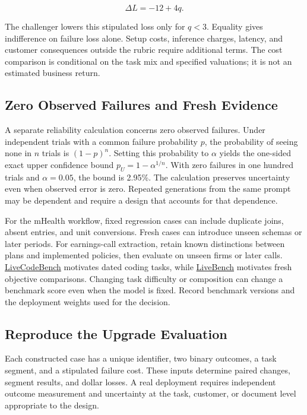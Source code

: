 \[
\Delta L=-12+4q.
\]

The challenger lowers this stipulated loss only for \(q<3\). Equality
gives indifference on failure loss alone. Setup costs, inference
charges, latency, and customer consequences outside the rubric require
additional terms. The cost comparison is conditional on the task mix and
specified valuations; it is not an estimated business return.

\hypertarget{M07-zero-observed-failures-and-fresh-evidence}{%
\subsection{Zero Observed Failures and Fresh
Evidence}\label{M07-zero-observed-failures-and-fresh-evidence}}

\noindent \noindent A separate reliability calculation concerns zero observed
failures. Under independent trials with a common failure probability
\(p\), the probability of seeing none in \(n\) trials is \((1-p)^n\).
Setting this probability to \(\alpha\) yields the one-sided exact upper
confidence bound \(p_U=1-\alpha^{1/n}\). With zero failures in one
hundred trials and \(\alpha=0.05\), the bound is 2.95\%. The calculation
preserves uncertainty even when observed error is zero. Repeated
generations from the same prompt may be dependent and require a design
that accounts for that dependence.

For the mHealth workflow, fixed regression cases can include duplicate
joins, absent entries, and unit conversions. Fresh cases can introduce
unseen schemas or later periods. For earnings-call extraction, retain
known distinctions between plans and implemented policies, then evaluate
on unseen firms or later calls.
\href{https://arxiv.org/abs/2403.07974v2}{LiveCodeBench} motivates dated
coding tasks, while \href{https://arxiv.org/abs/2406.19314v2}{LiveBench}
motivates fresh objective comparisons. Changing task difficulty or
composition can change a benchmark score even when the model is fixed.
Record benchmark versions and the deployment weights used for the
decision.

\hypertarget{M07-reproduce-the-upgrade-evaluation}{%
\subsection{Reproduce the Upgrade
Evaluation}\label{M07-reproduce-the-upgrade-evaluation}}

\noindent \noindent Each constructed case has a unique identifier, two binary
outcomes, a task segment, and a stipulated failure cost. These inputs
determine paired changes, segment results, and dollar losses. A real
deployment requires independent outcome measurement and uncertainty at
the task, customer, or document level appropriate to the design.

